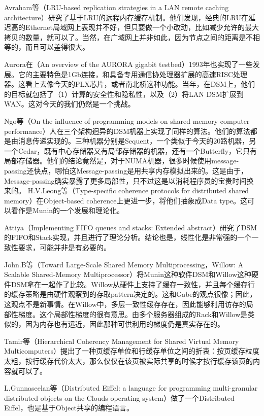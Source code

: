 \documentclass[a4paper,twoside]{scrbook}
\begin{document}
Avraham等（LRU-based replication strategies in a LAN remote caching architecture）研究了基于LRU的远程内存缓存机制。他们发现，经典的LRU在延迟高的Ethernet局域网上表现并不好，但只要做一个小改动，比如减少允许的最大拷贝的数量，就可以了。当然，在广域网上并非如此，因为节点之间的距离是不相等的，而且可以差得很大。

Aurora在（An overview of the AURORA gigabit testbed）1993年也实现了一些发展。它的主要特色是1Gb连接，和具备专用通信协处理器扩展的高速RISC处理器。这看上去像今天的PLX芯片，或者南北桥这种功能。当年，在DSM上，他们的目标就包括了（1）计算的安全性和隐私性，以及（2）将LAN DSM扩展到WAN。这对今天的我们仍然是一个挑战。

Ngo等（On the influence of programming models on shared memory computer performance）人在三个架构迥异的DSM机器上实现了同样的算法。他们的算法都是由消息传递实现的。三种机器分别是Sequent，一个类似于今天的20路机器，另一个Cedar，既有中心存储器又有局部存储器的机器，还有一个Butterfly，它只有局部存储器。他们的结论竟然是，对于NUMA机器，很多时候使用message-passing还快点，哪怕这Message-passing是用共享内存模拟出来的。这是由于，Message-passing确实暴露了更多局部性，只不过这是以消耗程序员的宝贵时间换来的。
H.V.Leong等（Type-specific coherence protocols for distributed shared memory）在Object-based coherence上更进一步，将他们抽象成Data type。这可以看作是Munin的一个发展和理论化。

Attiya（Implementing FIFO queues and stacks: Extended abstract）研究了DSM的FIFO和Stack实现，并且进行了理论分析。结论也是，线性化是非常强的一个一致性要求，可能并非是有必要的。

John.B等（Toward Large-Scale Shared Memory Multiprocessing，Willow: A Scalable Shared-Memory Multiprocessor）将Munin这种软件DSM和Willow这种硬件DSM拿在一起作了比较。Willow从硬件上支持了缓存一致性，并且每个缓存行的缓存策略是由硬件观察到的存取pattern决定的。这和Gabe的观点很像；因此，这观点不是新事情。在Willow中，多层一致性缓存存在，因此能够利用访存的局部性梯度。这个局部性梯度的很有意思。由多个服务器组成的Rack和Willow是类似的，因为内存也有远近，因此那种可供利用的梯度仍是真实存在的。

Tamir等（Hierarchical Coherency Management for Shared Virtual Memory Multicomputers）提出了一种页缓存单位和行缓存单位之间的折衷：按页缓存粒度太粗，按行缓存代价太大，那么仅仅在该页被实际共享的时候才按行缓存该页的内容就可以了。

L.Gunnaseelan等（Distributed Eiffel: a language for programming multi-granular distributed objects on the Clouds operating system）做了一个Distributed Eiffel，也是基于Object共享的编程语言。
\end{document}
